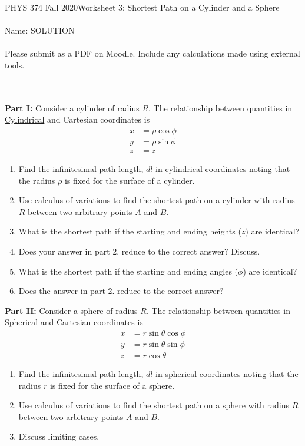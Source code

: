 \documentclass[12pt]{article}
\newcommand{\purple}[1]{{\color{purple} #1}}
\begin{document}
PHYS 374 Fall 2020\hfill Worksheet 3: Shortest Path on a Cylinder and a Sphere\\
\\
Name: \purple{SOLUTION} \\
\\
Please submit as a PDF on Moodle. Include any calculations made using external tools.

\hrulefill
\\
\\
\noindent
\textbf{Part I: }Consider a cylinder of radius $R$. The relationship between quantities in \href{https://mathworld.wolfram.com/CylindricalCoordinates.html}{Cylindrical} and Cartesian coordinates is
\begin{equation}
\begin{split}
x&=\rho\cos\phi\\
y&=\rho\sin\phi\\
z&=z
\end{split}
\end{equation}
\begin{enumerate}
\item Find the infinitesimal path length, $dl$ in cylindrical coordinates noting that the radius $\rho$ is fixed for the surface of a cylinder.
\item Use calculus of variations to find the shortest path on a cylinder with radius $R$ between two arbitrary points $A$ and $B$.
\item What is the shortest path if the starting and ending heights ($z$) are identical?
\item Does your answer in part 2. reduce to the correct answer? Discuss.
\item What is the shortest path if the starting and ending angles ($\phi$) are identical?
\item Does the answer in part 2. reduce to the correct answer?
\end{enumerate}
\textbf{Part II: }Consider a sphere of radius $R$. The relationship between quantities in \href{https://mathworld.wolfram.com/SphericalCoordinates.html}{Spherical} and Cartesian coordinates is
\begin{equation}
\begin{split}
x&=r\sin\theta\cos\phi\\
y&=r\sin\theta\sin\phi\\
z&=r\cos\theta
\end{split}
\end{equation}
\begin{enumerate}
\item Find the infinitesimal path length, $dl$ in spherical coordinates noting that the radius $r$ is fixed for the surface of a sphere.
\item Use calculus of variations to find the shortest path on a sphere with radius $R$ between two arbitrary points $A$ and $B$.
\item Discuss limiting cases.
\end{enumerate}
\end{document}
